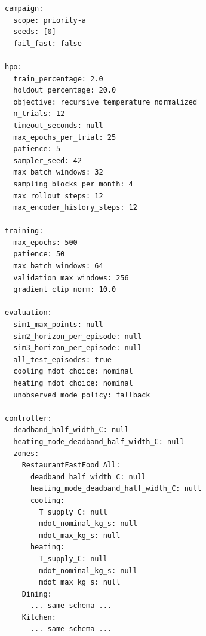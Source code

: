 \documentclass[10pt]{article}
\begin{document}
\begin{Verbatim}[fontsize=\small]
campaign:
  scope: priority-a
  seeds: [0]
  fail_fast: false

hpo:
  train_percentage: 2.0
  holdout_percentage: 20.0
  objective: recursive_temperature_normalized
  n_trials: 12
  timeout_seconds: null
  max_epochs_per_trial: 25
  patience: 5
  sampler_seed: 42
  max_batch_windows: 32
  sampling_blocks_per_month: 4
  max_rollout_steps: 12
  max_encoder_history_steps: 12

training:
  max_epochs: 500
  patience: 50
  max_batch_windows: 64
  validation_max_windows: 256
  gradient_clip_norm: 10.0

evaluation:
  sim1_max_points: null
  sim2_horizon_per_episode: null
  sim3_horizon_per_episode: null
  all_test_episodes: true
  cooling_mdot_choice: nominal
  heating_mdot_choice: nominal
  unobserved_mode_policy: fallback

controller:
  deadband_half_width_C: null
  heating_mode_deadband_half_width_C: null
  zones:
    RestaurantFastFood_All:
      deadband_half_width_C: null
      heating_mode_deadband_half_width_C: null
      cooling:
        T_supply_C: null
        mdot_nominal_kg_s: null
        mdot_max_kg_s: null
      heating:
        T_supply_C: null
        mdot_nominal_kg_s: null
        mdot_max_kg_s: null
    Dining:
      ... same schema ...
    Kitchen:
      ... same schema ...
\end{Verbatim}
\end{document}
